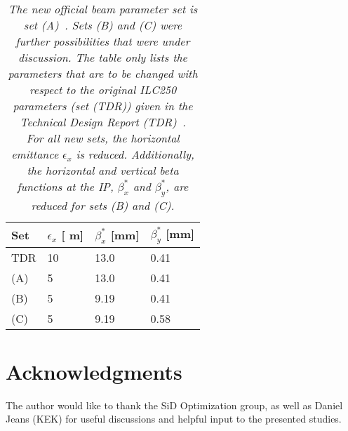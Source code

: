 \documentclass[12pt]{article}
\newcommand{\murm}{%
  \ifmmode
    \mathchoice
        {\hbox{\normalsize\textmu}}
        {\hbox{\normalsize\textmu}}
        {\hbox{\scriptsize\textmu}}
        {\hbox{\tiny\textmu}}%
  \else
    \textmu
  \fi
}
\begin{document}
\begin{table}[h]
\caption{\textit{The new official beam parameter set is set (A)~\cite{CR-0016}.
Sets (B) and (C) were further possibilities that were under discussion.
The table only lists the parameters that are to be changed with respect to the original ILC250 parameters (set (TDR)) given in the Technical Design Report (TDR)~\cite[p. 11]{TDR1}.\\
For all new sets, the horizontal emittance $\epsilon_x$ is reduced. 
Additionally, the horizontal and vertical beta functions at the IP, $\beta^*_x$ and $\beta^*_y$, are reduced for sets (B) and (C).}}
\label{tab:Parameters}
\centering
\begin{tabularx}{0.52\textwidth}{llll}
\hline\hline
\textbf{Set}  & \textbf{$\epsilon_x$ [\murm m]} & \textbf{$\beta^*_x$ [mm]} & \textbf{$\beta^*_y$ [mm]}\\
\hline
\cline{1-4}
\hline
 TDR & 10 & 13.0 & 0.41\\
 \rowcolor{Gray}
 (A) & 5 & 13.0 & 0.41\\
 (B) & 5 & 9.19 & 0.41\\
 (C) & 5 & 9.19 & 0.58\\
\hline\hline
\end{tabularx}
\end{table}







\section*{Acknowledgments}
The author would like to thank the SiD Optimization group, as well as Daniel Jeans (KEK) for useful discussions and helpful input to the presented studies.

%




\end{document}
